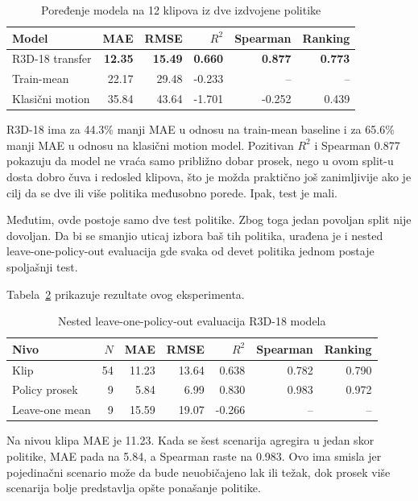 ﻿\documentclass[12pt,a4paper]{report}
\begin{document}
\begin{table}[H]
  \centering
  \caption{Poređenje modela na 12 klipova iz dve izdvojene politike}
  \label{tab:metrics}
  \begin{tabular}{p{4.1cm}rrrrr}
    \toprule
    Model & MAE & RMSE & $R^2$ & Spearman & Ranking \\
    \midrule
    R3D-18 transfer & \textbf{12.35} & \textbf{15.49} & \textbf{0.660} & \textbf{0.877} & \textbf{0.773} \\
    Train-mean & 22.17 & 29.48 & -0.233 & -- & -- \\
    Klasični motion & 35.84 & 43.64 & -1.701 & -0.252 & 0.439 \\
    \bottomrule
  \end{tabular}
\end{table}

R3D-18 ima za 44.3\% manji MAE u odnosu na train-mean baseline i za 65.6\%
manji MAE u odnosu na klasični motion model. Pozitivan $R^2$ i Spearman 0.877
pokazuju da model ne vraća samo približno dobar prosek, nego u ovom split-u
dosta dobro čuva i redosled klipova, što je možda praktično još zanimljivije ako
je cilj da se dve ili više politika međusobno porede. Ipak, test je mali.

Međutim, ovde postoje samo dve test politike. Zbog toga jedan povoljan split
nije dovoljan. Da bi se smanjio uticaj izbora baš tih politika, urađena je i
nested leave-one-policy-out evaluacija gde svaka od devet politika jednom
postaje spoljašnji test.

Tabela~\ref{tab:nested-metrics} prikazuje rezultate ovog eksperimenta.

\begin{table}[H]
  \centering
  \caption{Nested leave-one-policy-out evaluacija R3D-18 modela}
  \label{tab:nested-metrics}
  \begin{tabular}{lrrrrrr}
    \toprule
    Nivo & $N$ & MAE & RMSE & $R^2$ & Spearman & Ranking \\
    \midrule
    Klip & 54 & 11.23 & 13.64 & 0.638 & 0.782 & 0.790 \\
    Policy prosek & 9 & 5.84 & 6.99 & 0.830 & 0.983 & 0.972 \\
    Leave-one mean & 9 & 15.59 & 19.07 & -0.266 & -- & -- \\
    \bottomrule
  \end{tabular}
\end{table}

Na nivou klipa MAE je 11.23. Kada se šest scenarija agregira u jedan skor
politike, MAE pada na 5.84, a Spearman raste na 0.983. Ovo ima smisla jer
pojedinačni scenario može da bude neuobičajeno lak ili težak, dok prosek više
scenarija bolje predstavlja opšte ponašanje politike.
\end{document}
